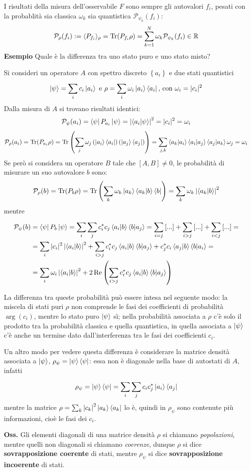 I risultati della misura dell'osservabile $F$ sono sempre gli autovalori $f_i$, pesati con la probablità
sia classica $\omega_k$ sia quantistica $\mathcal{P}_{\psi_k}(f_i)$:
$$\mathcal{P}_\rho(f_i) := \langle P_{f_i}\rangle_\rho = \Tr(P_{f_i}\rho) = 
\sum_{k=1}^{N}\omega_k \mathcal{P}_{\psi_k}(f_i)\in\mathbb{R}$$
\textbf{Esempio} Quale è la differenza tra uno stato puro e uno stato misto?

Si consideri un operatore $A$ con spettro discreto $\left\{a_i\right\}$ e due stati quantistici
$$\ket{\psi} = \sum_{i}^{}c_i\ket{a_i} \text{ e } \rho = \sum_{i}^{}\omega_i\ket{a_i}\bra{a_i}
\text{, con } \omega_i = |c_i|^2
$$
Dalla misura di $A$ si trovano risultati identici:
$$\mathcal{P}_\psi(a_i) = \bra{\psi}P_{a_i}\ket{\psi} = \left|\bra{a_i}\ket{\psi}\right|^2 =
|c_i|^2 = \omega_i$$
$$\mathcal{P}_\rho(a_i) = \Tr(P_{a_i}\rho) =
\Tr\left( \sum_{j}^{}\omega_j \left( \ket{a_i}\bra{a_i}\right)\left(\ket{a_j}\bra{a_j}\right) \right) = 
\sum_{j,k}^{}\bra{a_k}\ket{a_i}\bra{a_i}\ket{a_j}\bra{a_j}\ket{a_k}\omega_j=\omega_i
$$
Se però si considera un operatore $B$ tale che $\left[A,B\right] \neq0$, le probabilità di misurare un suo
autovalore $b$ sono:
$$\mathcal{P}_\rho(b) = \Tr(P_b\rho) = \Tr\left( \sum_{k}^{}\omega_k\ket{a_k}\bra{a_k}\ket{b}\bra{b}\right)=
\sum_{k}^{}\omega_k\left|\bra{a_k}\ket{b}\right|^2
$$
mentre
\begin{align*}
    \mathcal{P}_\psi(b)&=\bra{\psi}P_b\ket{\psi}=
    \sum_{i}^{}\sum_{j}c_i^*c_j\bra{a_i}\ket{b}\bra{b}\ket{a_j} =
    \sum_{i=j}\left[...\right] +\sum_{i>j}\left[...\right]+\sum_{i<j}\left[...\right] = \\
    &=\sum_{i}|c_i|^2\left|\bra{a_i}\ket{b}\right|^2 +
    \sum_{i>j}c_i^*c_j\bra{a_i}\ket{b}\bra{b}\ket{a_j} + c_j^*c_i\bra{a_j}\ket{b}\bra{b}\ket{a_i}=\\
    &=\sum_{i}\omega_i\left|\bra{a_i}\ket{b}\right|^2 +
    2\Re\left( \sum_{i>j} c_i^*c_j\bra{a_i}\ket{b}\bra{b}\ket{a_j}\right) 
\end{align*}

La differenza tra queste probabilità può essere intesa nel seguente modo: la miscela di stati puri $\rho$
non comprende le fasi dei coefficienti di probabilità $\arg(c_i)$, mentre lo stato puro $\ket{\psi}$ sì;
nella probabilità associata a $\rho$ c'è solo il prodotto tra la probabilità classica e quella quantistica, 
in quella associata a $\ket{\psi}$ c'è anche un termine dato dall'interferenza tra le fasi dei coefficienti
$c_i$.

Un altro modo per vedere questa differenza è considerare la matrice densità associata a $\ket{\psi}$,
$\rho_\psi = \ket{\psi}\bra{\psi}$: essa non è diagonale nella base di autostati di $A$, infatti
$$\rho_\psi = \ket{\psi}\bra{\psi} = \sum_{i}\sum_{j}^{}c_ic_j^*\ket{a_i}\bra{a_j}$$
mentre la matrice $\rho = \sum_{k}\left|c_k\right|^2\ket{a_k}\bra{a_k}$ lo è, quindi in $\rho_\psi$ sono
contenute più informazioni, cioè le fasi dei $c_i$.

\textbf{Oss.} Gli elementi diagonali di una matrice densità $\rho$ si chiamano \textit{popolazioni}, 
mentre quelli non diagonali si chiamano \textit{coerenze}, dunque $\rho$ si dice
\textbf{sovrapposizione coerente} di stati, mentre $\rho_\psi$ si dice
\textbf{sovrapposizione incoerente} di stati.

